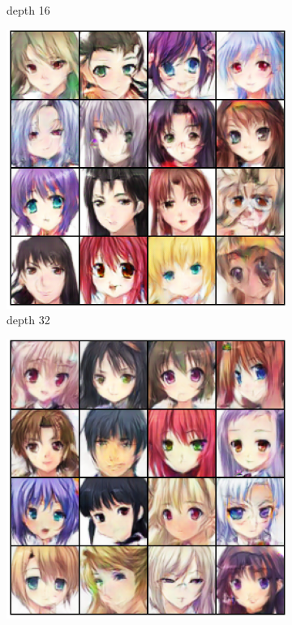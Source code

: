 \begin{frame}
\begin{center}
\begin{figure}[H]
\begin{subfigure}[b]{0.24\textwidth}
                \caption{depth 16}
                \label{fig:anime_16}
            \end{subfigure}
            \hfill
            \begin{subfigure}[b]{0.24\textwidth}
                \centering
                \includegraphics[width=\textwidth]{resources/images/output_anime_32.eps}
                \caption{depth 32}
                \label{fig:anime_32}
            \end{subfigure}
            \hfill
            \begin{subfigure}[b]{0.24\textwidth}
                \centering
                \includegraphics[width=\textwidth]{resources/images/output_anime_64.eps}

\end{subfigure}
\end{figure}
\end{center}
\end{frame}
